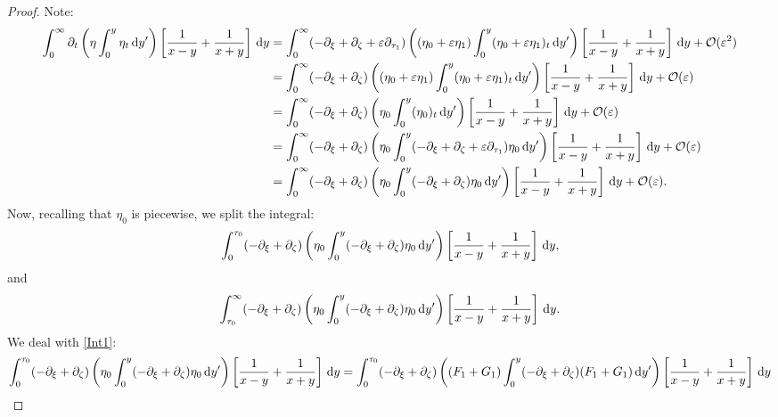 \documentclass[10pt,reqno,oneside,a4paper, landscape]{article}
\begin{document}
\begin{proof}
Note:
\begin{align*}
\int_0^\infty \partial_t \left( \eta \int^{y}_0\eta_{t} \,\mathrm{d} y' \right) \left[ \frac{1}{x-y} + \frac{1}{x+y} \right] \,\mathrm{d} y &= \int_0^\infty (- \partial_\xi + \partial_\zeta + \varepsilon \partial_{\tau_1})\left( (\eta_0 + \varepsilon \eta_1) \int^{y}_0(\eta_0 + \varepsilon \eta_1)_{t} \,\mathrm{d} y' \right) \left[ \frac{1}{x-y} + \frac{1}{x+y} \right] \,\mathrm{d} y + \mathcal{O}(\varepsilon^2)\\
&= \int_0^\infty (- \partial_\xi + \partial_\zeta)\left( (\eta_0 + \varepsilon \eta_1) \int^{y}_0(\eta_0 + \varepsilon \eta_1)_{t} \,\mathrm{d} y' \right) \left[ \frac{1}{x-y} + \frac{1}{x+y} \right] \,\mathrm{d} y + \mathcal{O}(\varepsilon)\\
&= \int_0^\infty (- \partial_\xi + \partial_\zeta)\left( \eta_0 \int^{y}_0 (\eta_0)_{t} \,\mathrm{d} y' \right) \left[ \frac{1}{x-y} + \frac{1}{x+y} \right] \,\mathrm{d} y + \mathcal{O}(\varepsilon)\\
&= \int_0^\infty (- \partial_\xi + \partial_\zeta)\left( \eta_0 \int^{y}_0 (- \partial_\xi + \partial_\zeta + \varepsilon \partial_{\tau_1})\eta_0 \,\mathrm{d} y' \right) \left[ \frac{1}{x-y} + \frac{1}{x+y} \right] \,\mathrm{d} y + \mathcal{O}(\varepsilon)\\
&= \int_0^\infty (- \partial_\xi + \partial_\zeta)\left( \eta_0 \int^{y}_0 (- \partial_\xi + \partial_\zeta)\eta_0 \,\mathrm{d} y' \right) \left[ \frac{1}{x-y} + \frac{1}{x+y} \right] \,\mathrm{d} y + \mathcal{O}(\varepsilon).
\end{align*}
Now, recalling that $\eta_0$ is piecewise, we split the integral:
\begin{equation}\label{Int1}
\int_0^{\tau_0} (- \partial_\xi + \partial_\zeta)\left( \eta_0 \int^{y}_0 (- \partial_\xi + \partial_\zeta)\eta_0 \,\mathrm{d} y' \right) \left[ \frac{1}{x-y} + \frac{1}{x+y} \right] \,\mathrm{d} y,
\end{equation}
and
\begin{equation}\label{Int2}
\int_{\tau_0}^\infty (- \partial_\xi + \partial_\zeta)\left( \eta_0 \int^{y}_0 (- \partial_\xi + \partial_\zeta)\eta_0 \,\mathrm{d} y' \right) \left[ \frac{1}{x-y} + \frac{1}{x+y} \right] \,\mathrm{d} y.
\end{equation}
We deal with \eqref{Int1}:
\begin{align*}
\int_0^{\tau_0} (- \partial_\xi + \partial_\zeta)\left( \eta_0 \int^{y}_0 (- \partial_\xi + \partial_\zeta)\eta_0 \D y' \right) \left[ \frac{1}{x-y} + \frac{1}{x+y} \right] \D y &= 
\int_0^{\tau_0} (- \partial_\xi + \partial_\zeta)\left( (F_1 + G_1) \int^{y}_0 (- \partial_\xi + \partial_\zeta)(F_1 + G_1) \D y' \right) \left[ \frac{1}{x-y} + \frac{1}{x+y} \right] \D y \\

\end{align*}
\end{proof}
\end{document}
